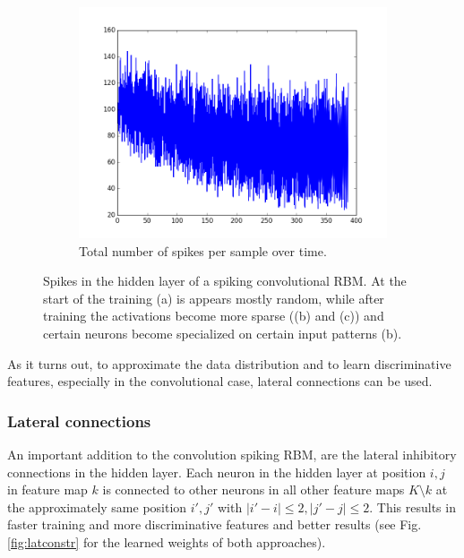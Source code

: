 \begin{figure}[h!]
	\begin{subfigure}[t]{.32\textwidth}
  		\centering
  		\includegraphics[width=.9\linewidth]{imgs/reconst/hact.png}
  		\caption{Total number of spikes per sample over time.}
  		\label{fig:sub2}
	\end{subfigure}
	\caption{Spikes in the hidden layer of a spiking convolutional RBM. At the start of the training (a) is appears mostly random, while after training the activations become more sparse ((b) and (c))  and certain neurons become specialized on certain input patterns (b).}
	\label{fig:actdevstr}
\end{figure}

As it turns out, to approximate the data distribution and to learn discriminative features, especially in the convolutional case, lateral connections can be used.

\subsubsection{Lateral connections} \label{c:latinhibexp}

An important addition to the convolution spiking RBM, are the lateral inhibitory connections in the hidden layer. 
Each neuron in the hidden layer at position $i,j$ in feature map $k$ is connected to other neurons in all other feature maps $K \setminus k$ at the approximately same position $i', j'$ with $ |i'-i| \le 2 , |j' - j| \le 2 $.   
This results in faster training and more discriminative features and better results (see Fig. \ref{fig:latconstr} for the learned weights of both approaches).


